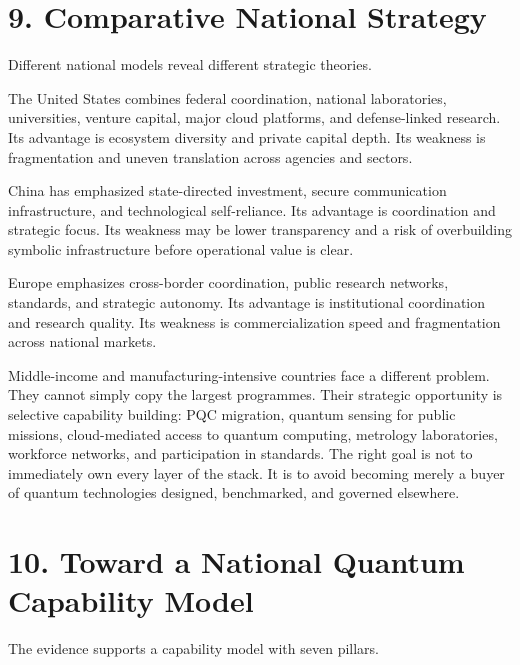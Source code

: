 \documentclass[
  11pt,
  letterpaper,
]{article}
\begin{document}
\section{9. Comparative National
Strategy}\label{comparative-national-strategy}

Different national models reveal different strategic theories.

The United States combines federal coordination, national laboratories,
universities, venture capital, major cloud platforms, and defense-linked
research. Its advantage is ecosystem diversity and private capital
depth. Its weakness is fragmentation and uneven translation across
agencies and sectors.

China has emphasized state-directed investment, secure communication
infrastructure, and technological self-reliance. Its advantage is
coordination and strategic focus. Its weakness may be lower transparency
and a risk of overbuilding symbolic infrastructure before operational
value is clear.

Europe emphasizes cross-border coordination, public research networks,
standards, and strategic autonomy. Its advantage is institutional
coordination and research quality. Its weakness is commercialization
speed and fragmentation across national markets.

Middle-income and manufacturing-intensive countries face a different
problem. They cannot simply copy the largest programmes. Their strategic
opportunity is selective capability building: PQC migration, quantum
sensing for public missions, cloud-mediated access to quantum computing,
metrology laboratories, workforce networks, and participation in
standards. The right goal is not to immediately own every layer of the
stack. It is to avoid becoming merely a buyer of quantum technologies
designed, benchmarked, and governed elsewhere.

\section{10. Toward a National Quantum Capability
Model}\label{toward-a-national-quantum-capability-model}

The evidence supports a capability model with seven pillars.
\end{document}
